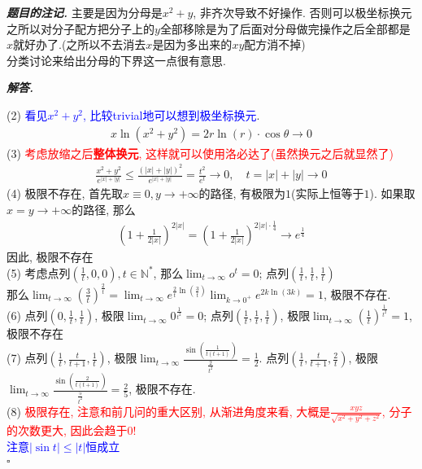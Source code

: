 \documentclass[10pt, a4paper, oneside]{ctexart}
\newenvironment{solution}{%
  \par\noindent\textbf{\textit{解答. }}\ignorespaces
}{%
  \hfill\ensuremath{\square}\par %
}
\newenvironment{note}{\par\noindent\textbf{\textit{题目的注记. }}\ignorespaces}{\par}
\begin{document}
\begin{note}
主要是因为分母是$x^2+y$, 非齐次导致不好操作. 否则可以极坐标换元\\
之所以对分子配方把分子上的$y$全部移除是为了后面对分母做完操作之后全部都是$x$就好办了.(之所以不去消去$x$是因为多出来的$xy$配方消不掉)\\
分类讨论来给出分母的下界这一点很有意思.
\end{note}
\begin{solution}
(2) \textcolor{blue}{看见$x^2+y^2$, 比较trivial地可以想到极坐标换元}. 
\begin{align*}
    x\ln(x^2+y^2)=2r\ln(r)\cdot \cos\theta\to 0
\end{align*}
(3) \textcolor{red}{考虑放缩之后\textbf{整体换元}, 这样就可以使用洛必达了(虽然换元之后就显然了)}
\begin{align*}
    \frac{x^2+y^2}{e^{|x|+|y|}}\leq \frac{(|x|+|y|)^2}{e^{|x|+|y|}} = \frac{t^2}{e^t}\to 0 , \quad t=|x|+|y|\to 0
\end{align*}
(4) 极限不存在, 首先取$x\equiv 0, y\to +\infty$的路径, 有极限为$1$(实际上恒等于$1$). 如果取$x=y\to +\infty$的路径, 那么
\begin{align*}
    (1+\frac{1}{2|x|})^{2|x|}=(1+\frac{1}{2|x|})^{2|x| \cdot \frac{1}{4}}\to e^{\frac{1}{4}}
\end{align*}
因此, 极限不存在\\
(5) 考虑点列$(\frac{1}{t},0,0), t\in \mathbb{N}^*$, 那么$\lim_{t\to\infty}o^{t}=0$; 点列$(\frac{1}{t},\frac{1}{t},\frac{1}{t})$\\那么$\lim_{t\to\infty}(\frac{3}{t})^{\frac{2}{t}}=\lim_{t\to\infty} e^{\frac{2}{t}\ln(\frac{3}{t})} \lim_{k\to 0^+}e^{2k\ln(3k)}=1$, 极限不存在.\\
(6) 点列$(0,\frac{1}{t},\frac{1}{t})$, 极限$\lim_{t\to\infty} 0^{\frac{1}{t^2}}=0$; 点列$(\frac{1}{t},\frac{1}{t},\frac{1}{t})$, 极限$\lim_{t\to\infty} (\frac{1}{t})^{\frac{1}{t^2}}=1$, 极限不存在\\
(7) 点列$(\frac{1}{t},\frac{t}{t+1},\frac{1}{t})$, 极限$\lim_{t\to\infty}\frac{\sin(\frac{1}{t(t+1)})}{\frac{2}{t^2}}=\frac{1}{2}$. 点列$(\frac{1}{t},\frac{t}{t+1},\frac{2}{t})$, 极限$\lim_{t\to\infty}\frac{\sin(\frac{2}{t(t+1)})}{\frac{5}{t^2}}=\frac{2}{5}$, 极限不存在.\\
(8) \textcolor{red}{极限存在, 注意和前几问的重大区别, 从渐进角度来看, 大概是$\frac{xyz}{\sqrt{x^2+y^2+z^2}}$, 分子的次数更大, 因此会趋于$0$!}\\
\textcolor{blue}{注意$|\sin t|\leq |t|$恒成立}
\begin{align*}

\end{align*}
\end{solution}
\end{document}
